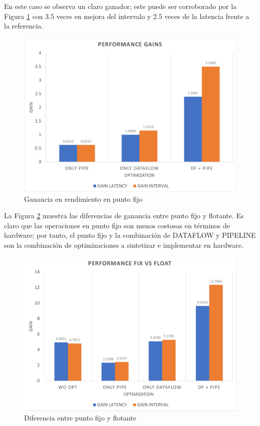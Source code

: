En este caso se observa un claro ganador; este puede ser corroborado por la Figura \ref{fig:perfGainFix} con 3.5 veces en mejora del intervalo y 2.5 veces de la latencia frente a la referencia.

\begin{figure}[!ht]
	\centering
		\includegraphics[scale=0.45]{Figures/PERFGAINFIX}
	\caption{Ganancia en rendimiento en punto fijo}
	\label{fig:perfGainFix}
\end{figure}

La Figura \ref{fig:fixfloat} muestra las diferencias de ganancia entre punto fijo y flotante. Es claro que las operaciones en punto fijo son menos costosas en términos de hardware; por tanto, el punto fijo y la combinación de DATAFLOW y PIPELINE son la combinación de optimizaciones a sintetizar e implementar en hardware.

\begin{figure}[!ht]
	\centering
		\includegraphics[scale=0.45]{Figures/fixfloat}
	\caption{Diferencia entre punto fijo y flotante}
	\label{fig:fixfloat}
\end{figure}

